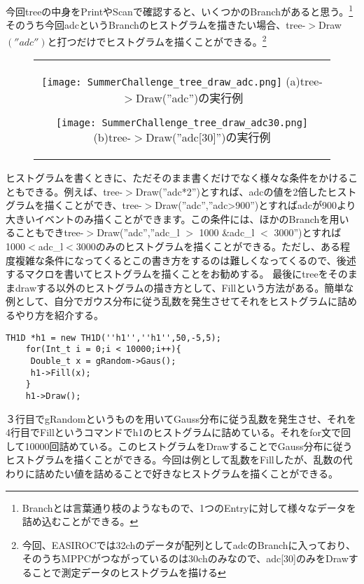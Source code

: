 \documentclass[10pt,a4j]{jarticle}
\begin{document}
今回treeの中身をPrintやScanで確認すると、いくつかのBranchがあると思う。\footnote{Branchとは言葉通り枝のようなもので、1つのEntryに対して様々なデータを詰め込むことができる。}そのうち今回adcというBranchのヒストグラムを描きたい場合、tree-$>$Draw$\left(''adc''\right)$と打つだけでヒストグラムを描くことができる。\footnote{今回、EASIROCでは32chのデータが配列としてadcのBranchに入っており、そのうちMPPCがつながっているのは30chのみなので、adc[30]のみをDrawすることで測定データのヒストグラムを描ける}
\begin{figure}[htbp]
\begin{center}
  \begin{tabular}{c}

    \begin{minipage}{0.5\hsize}
      \begin{center}
        \texttt{[image: SummerChallenge\_tree\_draw\_adc.png]}
        \hspace{1.6cm} (a)tree-$>$Draw(''adc'')の実行例
      \end{center}
    \end{minipage}

    \begin{minipage}{0.5\hsize}
      \begin{center}
        \texttt{[image: SummerChallenge\_tree\_draw\_adc30.png]}
        \hspace{1.6cm} (b)tree-$>$Draw(''adc[30]'')の実行例
      \end{center}
    \end{minipage}
  \end{tabular}
  \label{fig:tree_draw}
  \end{center}
\end{figure}

ヒストグラムを書くときに、ただそのまま書くだけでなく様々な条件をかけることもできる。例えば、tree-$>$Draw(''adc*2'')とすれば、adcの値を2倍したヒストグラムを描くことができ、tree-$>$Draw(''adc'',''adc>900'')とすればadcが900より大きいイベントのみ描くことができます。この条件には、ほかのBranchを用いることもできtree-$>$Draw(''adc'',''adc\_l $>$ 1000 \&adc\_l $<$ 3000'')とすれば1000$<$adc\_l$<$3000のみのヒストグラムを描くことができる。ただし、ある程度複雑な条件になってくるとこの書き方をするのは難しくなってくるので、後述するマクロを書いてヒストグラムを描くことをお勧めする。
最後にtreeをそのままdrawする以外のヒストグラムの描き方として、Fillという方法がある。簡単な例として、自分でガウス分布に従う乱数を発生させてそれをヒストグラムに詰めるやり方を紹介する。
\begin{lstlisting}[basicstyle=\ttfamily\footnotesize, frame=single]
    TH1D *h1 = new TH1D(''h1'',''h1'',50,-5,5);
    for(Int_t i = 0;i < 10000;i++){
     Double_t x = gRandom->Gaus();
     h1->Fill(x);
    }  
    h1->Draw();
 \end{lstlisting}
 ３行目でgRandomというものを用いてGauss分布に従う乱数を発生させ、それを4行目でFillというコマンドでh1のヒストグラムに詰めている。それをfor文で回して10000回詰めている。このヒストグラムをDrawすることでGauss分布に従うヒストグラムを描くことができる。今回は例として乱数をFillしたが、乱数の代わりに詰めたい値を詰めることで好きなヒストグラムを描くことができる。
\end{document}
